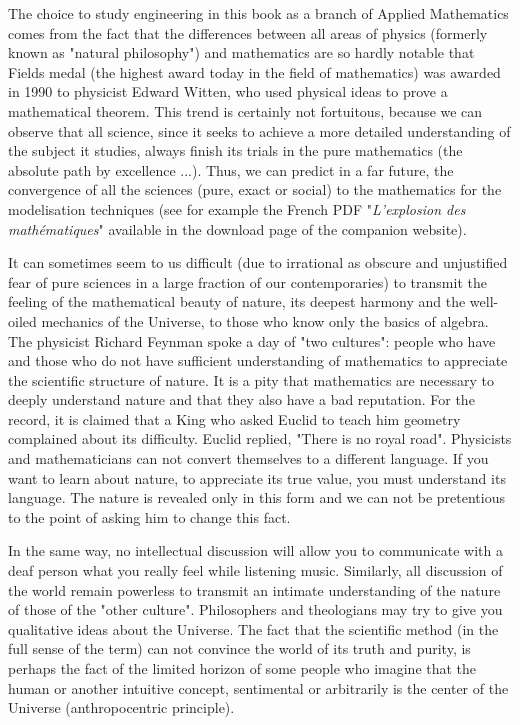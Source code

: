 	The choice to study engineering in this book as a branch of Applied Mathematics comes from the fact that the differences between all areas of physics (formerly known as "natural philosophy") and mathematics are so hardly notable that Fields medal (the highest award today in the field of mathematics) was awarded in 1990 to physicist Edward Witten, who used physical ideas to prove a mathematical theorem. This trend is certainly not fortuitous, because we can observe that all science, since it seeks to achieve a more detailed understanding of the subject it studies, always finish its trials in the pure mathematics (the absolute path by excellence ...). Thus, we can predict in a far future, the convergence of all the sciences (pure, exact or social) to the mathematics for the modelisation techniques (see for example the French PDF "\textit{L'explosion des mathématiques}" available in the download page of the companion website).

	It can sometimes seem to us difficult (due to irrational as obscure and unjustified fear of pure sciences in a large fraction of our contemporaries) to transmit the feeling of the mathematical beauty of nature, its deepest harmony and the well-oiled mechanics of the Universe, to those who know only the basics of algebra. The physicist Richard Feynman spoke a day of "two cultures": people who have and those who do not have sufficient understanding of mathematics to appreciate the scientific structure of nature. It is a pity that mathematics are necessary to deeply understand nature and that they also have a bad reputation. For the record, it is claimed that a King who asked Euclid to teach him geometry complained about its difficulty. Euclid replied, "There is no royal road". Physicists and mathematicians can not convert themselves to a different language. If you want to learn about nature, to appreciate its true value, you must understand its language. The nature is revealed only in this form and we can not be pretentious to the point of asking him to change this fact.

	In the same way, no intellectual discussion will allow you to communicate with a deaf person what you really feel while listening music. Similarly, all discussion of the world remain powerless to transmit an intimate understanding of the nature of those of the "other culture". Philosophers and theologians may try to give you qualitative ideas about the Universe. The fact that the scientific method (in the full sense of the term) can not convince the world of its truth and purity, is perhaps the fact of the limited horizon of some people who imagine that the human or another intuitive concept, sentimental or arbitrarily is the center of the Universe (anthropocentric principle).

